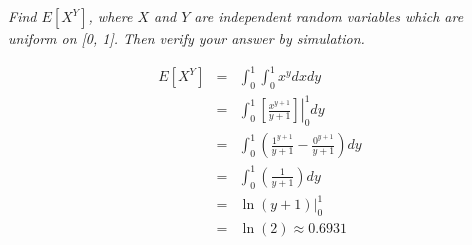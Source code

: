 \documentclass[12pt]{article}
\begin{document}
	{\em Find $E[X^Y]$, where $X$ and $Y$ are independent random variables which are uniform on [0, 1]. Then verify your answer by simulation.}
	
	\begin{eqnarray*}
	E[X^Y] &=& \int_{0}^{1} \int_{0}^{1} x^y dx dy \\
	&=& \int_{0}^{1}  \left. \left[ \frac{x^{y+1}}{y+1} \right] \right|_{0}^{1} dy \\
	&=& \int_{0}^{1}  \left( \frac{1^{y+1}}{y+1} - \frac{0^{y+1}}{y+1} \right) dy \\
	&=& \int_{0}^{1}  \left( \frac{1}{y+1} \right) dy \\
	&=& \left. \ln (y+1) \right|_{0}^{1}\\
	&=& \ln(2) \approx 0.6931
	\end{eqnarray*}
	


\end{document}
